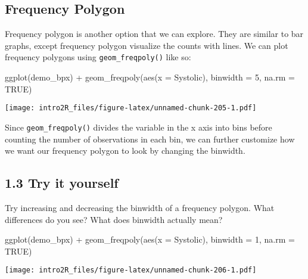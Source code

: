 \documentclass[
]{book}
\newenvironment{Shaded}{\begin{snugshade}}{\end{snugshade}}
\newcommand{\AttributeTok}[1]{\textcolor[rgb]{0.77,0.63,0.00}{#1}}
\newcommand{\ConstantTok}[1]{\textcolor[rgb]{0.00,0.00,0.00}{#1}}
\newcommand{\DecValTok}[1]{\textcolor[rgb]{0.00,0.00,0.81}{#1}}
\newcommand{\FunctionTok}[1]{\textcolor[rgb]{0.00,0.00,0.00}{#1}}
\newcommand{\NormalTok}[1]{#1}
\newcommand{\SpecialCharTok}[1]{\textcolor[rgb]{0.00,0.00,0.00}{#1}}
\begin{document}
\hypertarget{frequency-polygon}{%
\subsection{Frequency Polygon}\label{frequency-polygon}}

Frequency polygon is another option that we can explore. They are similar to bar graphs, except frequency polygon visualize the counts with lines. We can plot frequency polygons using \texttt{geom\_freqpoly()} like so:

\begin{Shaded}
\begin{Highlighting}[]
\FunctionTok{ggplot}\NormalTok{(demo\_bpx) }\SpecialCharTok{+} 
    \FunctionTok{geom\_freqpoly}\NormalTok{(}\FunctionTok{aes}\NormalTok{(}\AttributeTok{x =}\NormalTok{ Systolic), }\AttributeTok{binwidth =} \DecValTok{5}\NormalTok{, }\AttributeTok{na.rm =} \ConstantTok{TRUE}\NormalTok{)}
\end{Highlighting}
\end{Shaded}

\texttt{[image: intro2R\_files/figure-latex/unnamed-chunk-205-1.pdf]}

Since \texttt{geom\_freqpoly()} divides the variable in the x axis into bins before counting the number of observations in each bin, we can further customize how we want our frequency polygon to look by changing the binwidth.

\hypertarget{try-it-yourself-25}{%
\subsection{1.3 Try it yourself}\label{try-it-yourself-25}}

Try increasing and decreasing the binwidth of a frequency polygon. What differences do you see? What does binwidth actually mean?

\begin{Shaded}
\begin{Highlighting}[]
\FunctionTok{ggplot}\NormalTok{(demo\_bpx) }\SpecialCharTok{+} 
    \FunctionTok{geom\_freqpoly}\NormalTok{(}\FunctionTok{aes}\NormalTok{(}\AttributeTok{x =}\NormalTok{ Systolic), }\AttributeTok{binwidth =} \DecValTok{1}\NormalTok{, }\AttributeTok{na.rm =} \ConstantTok{TRUE}\NormalTok{)}
\end{Highlighting}
\end{Shaded}

\texttt{[image: intro2R\_files/figure-latex/unnamed-chunk-206-1.pdf]}
\end{document}
